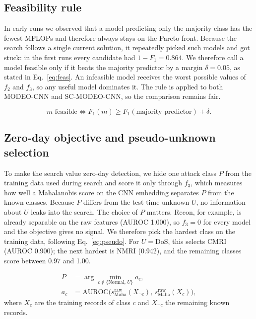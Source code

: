 \documentclass[10pt,twocolumn,letterpaper]{article}
\begin{document}
\subsection{Feasibility rule}
In early runs we observed that a model predicting only the majority class
has the fewest MFLOPs and therefore always stays on the Pareto front.
Because the search follows a single current solution, it repeatedly
picked such models and got stuck: in the first runs every candidate had
$1-F_1 = 0.864$. We therefore call a model feasible only if it beats the
majority predictor by a margin $\delta = 0.05$, as stated in
Eq.~\eqref{eq:feas}. An infeasible model receives the worst possible
values of $f_2$ and $f_3$, so any useful model dominates it. The rule is
applied to both MODEO-CNN and SC-MODEO-CNN, so the comparison remains
fair.

\begin{equation}\label{eq:feas}
m \text{ feasible} \iff F_1(m) \geq F_1(\text{majority predictor}) + \delta .
\end{equation}
\subsection{Zero-day objective and pseudo-unknown selection}
To make the search value zero-day detection, we hide one attack class $P$
from the training data used during search and score it only through $f_3$,
which measures how well a Mahalanobis score on the CNN embedding separates
$P$ from the known classes. Because $P$ differs from the test-time unknown
$U$, no information about $U$ leaks into the search. The choice of $P$
matters. Recon, for example, is already separable on the raw features
(AUROC 1.000), so $f_3 = 0$ for every model and the objective gives no
signal. We therefore pick the hardest class on the training data,
following Eq.~\eqref{eq:pseudo}. For $U = \text{DoS}$, this selects CMRI
(AUROC 0.900); the next hardest is NMRI (0.942), and the remaining classes
score between 0.97 and 1.00.

\begin{equation}\label{eq:pseudo}
\begin{aligned}
P &= \arg\min_{c \notin \{\text{Normal},\,U\}} a_c,\\
a_c &= \mathrm{AUROC}\big(s^{\mathrm{raw}}_{\mathrm{Maha}}(X_{\neg c}),\, s^{\mathrm{raw}}_{\mathrm{Maha}}(X_c)\big),
\end{aligned}
\end{equation}
where $X_c$ are the training records of class $c$ and $X_{\neg c}$ the remaining known records.
\end{document}

